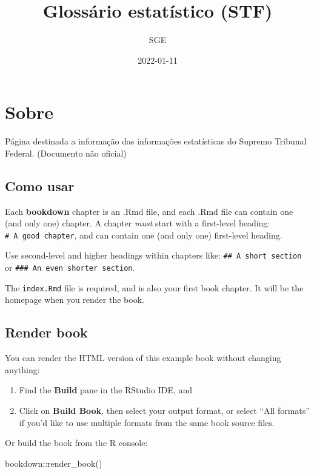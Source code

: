 \documentclass[
]{book}
\title{Glossário estatístico (STF)}
\author{SGE}
\date{2022-01-11}
\newenvironment{Shaded}{\begin{snugshade}}{\end{snugshade}}
\newcommand{\FunctionTok}[1]{\textcolor[rgb]{0.00,0.00,0.00}{#1}}
\newcommand{\NormalTok}[1]{#1}
\newcommand{\SpecialCharTok}[1]{\textcolor[rgb]{0.00,0.00,0.00}{#1}}
\theoremstyle{definition}
\theoremstyle{definition}
\theoremstyle{definition}
\theoremstyle{definition}
\theoremstyle{remark}
\begin{document}
\maketitle

{
\setcounter{tocdepth}{1}
\tableofcontents
}
\hypertarget{sobre}{%
\chapter{Sobre}\label{sobre}}

Página destinada a informação das informações estatísticas do Supremo Tribunal Federal. (Documento não oficial)

\hypertarget{como-usar}{%
\section{Como usar}\label{como-usar}}

Each \textbf{bookdown} chapter is an .Rmd file, and each .Rmd file can contain one (and only one) chapter. A chapter \emph{must} start with a first-level heading: \texttt{\#\ A\ good\ chapter}, and can contain one (and only one) first-level heading.

Use second-level and higher headings within chapters like: \texttt{\#\#\ A\ short\ section} or \texttt{\#\#\#\ An\ even\ shorter\ section}.

The \texttt{index.Rmd} file is required, and is also your first book chapter. It will be the homepage when you render the book.

\hypertarget{render-book}{%
\section{Render book}\label{render-book}}

You can render the HTML version of this example book without changing anything:

\begin{enumerate}
\def\labelenumi{\arabic{enumi}.}
\item
  Find the \textbf{Build} pane in the RStudio IDE, and
\item
  Click on \textbf{Build Book}, then select your output format, or select ``All formats'' if you'd like to use multiple formats from the same book source files.
\end{enumerate}

Or build the book from the R console:

\begin{Shaded}
\begin{Highlighting}[]
\NormalTok{bookdown}\SpecialCharTok{::}\FunctionTok{render\_book}\NormalTok{()}
\end{Highlighting}
\end{Shaded}
\end{document}
